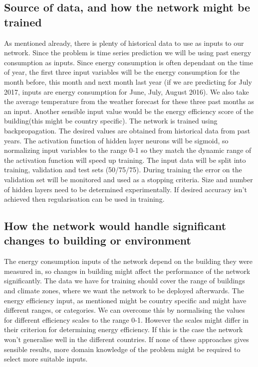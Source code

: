 \documentclass[a4paper, 11pt]{article}
\begin{document}
\subsection{Source of data, and how the network might be trained}
As mentioned already, there is plenty of historical data to use as inputs to our network. Since the problem is time series prediction we will be using past energy consumption as inputs. Since energy consumption is often dependant on the time of year, the first three input variables will be the energy consumption for the month before, this month and next month last year (if we are predicting for July 2017, inputs are energy consumption for June, July, August 2016). We also take the average temperature from the weather forecast for these three past months as an input. Another sensible input value would be the energy efficiency score of the building(this might be country specific).
The network is trained using backpropagation. The desired values are obtained from historical data from past years. The activation function of hidden layer neurons will be sigmoid, so normalizing input variables to the range 0-1 so they match the dynamic range of the activation function will speed up training. The input data will be split into training, validation and test sets (50/75/75). During training the error on the validation set will be monitored and used as a stopping criteria. Size and number of hidden layers need to be determined experimentally. If desired accuracy isn't achieved then regularisation can be used in training. 
\subsection{How the network would handle significant changes to building or environment}
The energy consumption inputs of the network depend on the building they were measured in, so changes in building might affect the performance of the network significantly. The data we have for training should cover the range of buildings and climate zones, where we want the network to be deployed afterwards. The energy efficiency input, as mentioned might be country specific and might have different ranges, or categories. We can overcome this by normalising the values for different efficiency scales to the range 0-1. However the scales might differ in their criterion for determining energy efficiency. If this is the case the network won't generalise well in the different countries. If none of these approaches gives sensible results, more domain knowledge of the problem might be required to select more suitable inputs.
\end{document}
